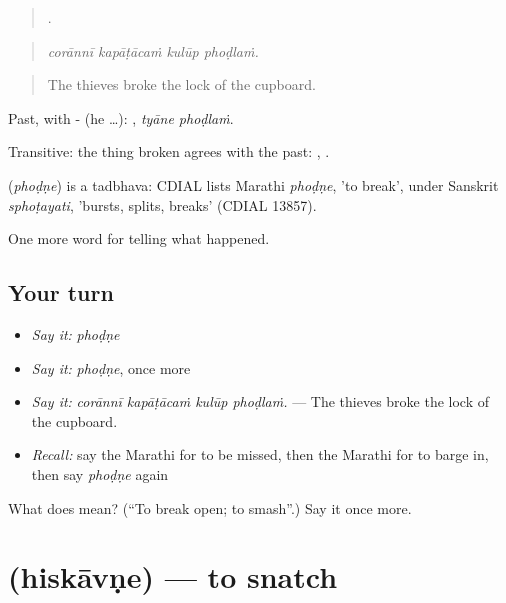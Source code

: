 \begin{quote}
   .
\end{quote}

\begin{quote}
\emph{corānnī kapāṭācaṁ kulūp phoḍlaṁ.}
\end{quote}

\begin{quote}
The thieves broke the lock of the cupboard.
\end{quote}

Past, with - (he …):  , \emph{tyāne phoḍlaṁ}.

Transitive: the thing broken agrees with the past:  ,  .

\begin{cousinweb}
\textbf{} (\emph{phoḍṇe}) is a tadbhava: CDIAL lists Marathi \emph{phoḍṇe}, 'to break', under Sanskrit \emph{sphoṭayati}, 'bursts, splits, breaks' (CDIAL 13857).
\end{cousinweb}

\begin{grammarlens}[title={What you've built}]
One more word for telling what happened.
\end{grammarlens}

\subsection*{Your turn}
\begin{itemize}
\raggedright
  \item \emph{Say it:} \emph{phoḍṇe}
  \item \emph{Say it:} \emph{phoḍṇe}, once more
  \item \emph{Say it:} \emph{corānnī kapāṭācaṁ kulūp phoḍlaṁ.} — The thieves broke the lock of the cupboard.
  \item \emph{Recall:} say the Marathi for to be missed, then the Marathi for to barge in, then say \emph{phoḍṇe} again
\end{itemize}

\begin{tcolorbox}[breakable,colback=teal!4,colframe=teal!35!black,title={Before you move on}]
What does  mean? (\textquotedblleft{}To break open; to smash\textquotedblright{}.) Say it once more.
\end{tcolorbox}
\section[\texorpdfstring{\mr{हिसकावणे} (hiskāvṇe)}{हिसकावणे (hiskāvṇe)}]{ (hiskāvṇe) — to snatch}

